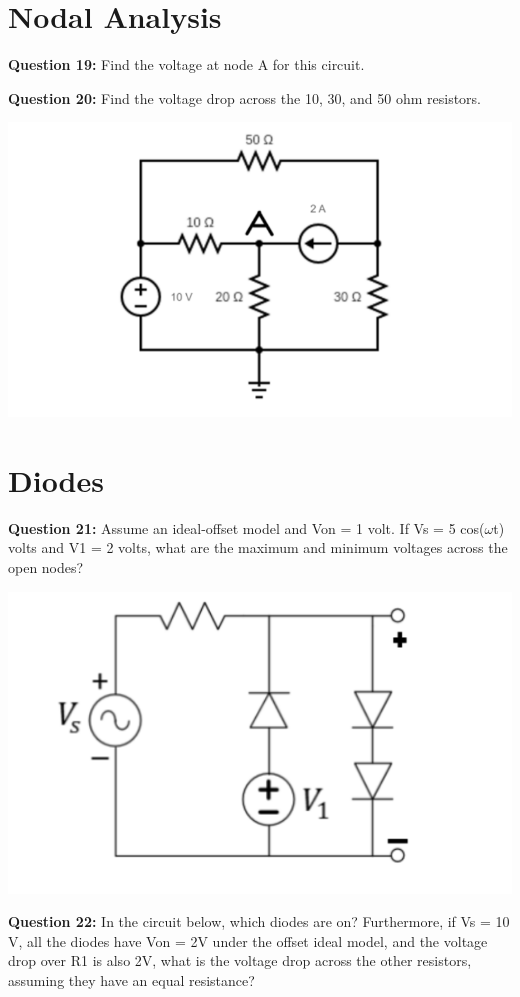 \documentclass{article}
\begin{document}
\section*{Nodal Analysis}
\textbf{Question 19:} Find the voltage at node A for this circuit.

\textbf{Question 20:} Find the voltage drop across the 10, 30, and 50 ohm resistors.

\begin{center}
    \includegraphics[width=0.75\linewidth]{figures/34.png}
\end{center}

\pagebreak

\section*{Diodes}
\textbf{Question 21:} Assume an ideal-offset model and Von = 1 volt. If Vs = 5 cos(\(\omega\)t) volts and V1 = 2 volts, what are the maximum and minimum voltages across the open nodes?

\begin{center}

        \includegraphics[width=0.75\linewidth]{figures/45.png}
\end{center}

\textbf{Question 22:} In the circuit below, which diodes are on? Furthermore, if Vs = 10 V, all the diodes have Von = 2V under the offset ideal model, and the voltage drop over R1 is also 2V, what is the voltage drop across the other resistors, assuming they have an equal resistance?
\end{document}
